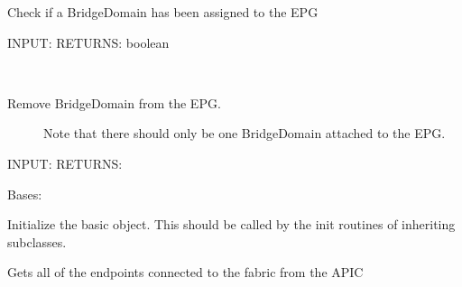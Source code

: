 \documentclass[letterpaper,10pt,english]{sphinxmanual}
\begin{document}
\begin{fulllineitems}

\begin{fulllineitems}
\label{acitoolkit:acitoolkit.EPG.has_bd}
Check if a BridgeDomain has been assigned to the EPG

INPUT:
RETURNS: boolean

\end{fulllineitems}


\begin{fulllineitems}
\label{acitoolkit:acitoolkit.EPG.remove_bd}~\begin{description}
\item[{Remove BridgeDomain from the EPG.}] \leavevmode
Note that there should only be one BridgeDomain attached
to the EPG.

\end{description}

INPUT:
RETURNS:

\end{fulllineitems}


\end{fulllineitems}


\begin{fulllineitems}
\label{acitoolkit:acitoolkit.Endpoint}
Bases: {\hyperref[acibaseobject:acibaseobject.BaseACIObject]{}}

Initialize the basic object.  This should be called by the
init routines of inheriting subclasses.

\begin{fulllineitems}
\label{acitoolkit:acitoolkit.Endpoint.get}
Gets all of the endpoints connected to the fabric from the APIC

\end{fulllineitems}


\end{fulllineitems}

\end{document}
